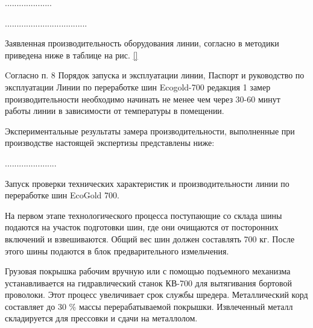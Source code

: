 
....................



...................................


Заявленная производительность оборудования линии, согласно в методики \cite{ecogold:2021} приведена ниже в таблице на рис. \ref{} 


Cогласно п. 8 Порядок запуска и эксплуатации линии, Паспорт и руководство по эксплуатации Линии по переработке шин Ecogold-700 редакция 1 замер производительности необходимо начинать не менее чем через 30-60 минут работы линии в зависимости от температуры в помещении.


Экспериментальные результаты замера производительности, выполненные при производстве настоящей экспертизы представлены ниже:



......................

Запуск проверки технических характеристик и производительности линии по переработке шин EcoGold 700.

На первом этапе технологического процесса поступающие со склада шины подаются на участок подготовки шин, где они очищаются от посторонних включений и взвешиваются. Общий вес шин должен составлять 700 кг. После этого шины подаются в блок предварительного измельчения.

Грузовая покрышка рабочим вручную или с помощью подъемного механизма устанавливается на гидравлический станок КВ-700 для вытягивания бортовой проволоки. Этот процесс увеличивает срок службы шредера. Металлический корд составляет до 30 \% массы перерабатываемой покрышки. Извлеченный металл складируется для прессовки и сдачи на металлолом.

